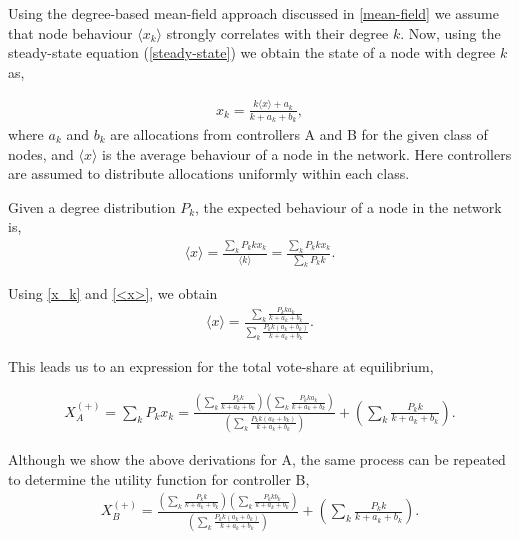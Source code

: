 Using the degree-based mean-field approach discussed in \cref{mean-field} we assume that node behaviour $\langle x_{k} \rangle$ strongly correlates with their degree $k$. Now, using the steady-state equation (\cref{steady-state}) we obtain the state of a node with degree $k$ as,

\begin{align}
    x_{k} = \frac{k\langle x \rangle+a_{k}}{k+a_{k}+b_{k}},
    \label{x_k}
\end{align} 
where $a_{k}$ and $b_{k}$ are allocations from controllers A and B for the given class of nodes, and $\langle x \rangle$ is the average behaviour of a node in the network. Here controllers are assumed to distribute allocations uniformly within each class. 

Given a degree distribution $P_{k}$, the expected behaviour of a node in the network is,
\begin{align}
    \langle x \rangle = \frac{\sum_{k} P_{k} k x_{k}}{\langle k \rangle} = \frac{\sum_{k} P_{k} k x_{k}}{\sum_{k} P_{k} k}.
    \label{<x>}
\end{align}

Using \cref{x_k} and \cref{<x>}, we obtain 
\begin{align}
    \langle x \rangle  = \frac{\sum_{k} \frac{P_{k} k a_{k}}{k+a_{k}+b_{k}}}{\sum_{k} \frac{P_{k} k (a_{k}+b_{k})}{k+a_{k}+b_{k}}}.
\end{align}

This leads us to an expression for the total vote-share at equilibrium,

\begin{align}
    X_{A}^{(+)} = \sum_{k} P_{k}x_{k} = \frac{(\sum_{k} \frac{P_{k} k }{k+a_{k}+b_{k}})(\sum_{k} \frac{P_{k} k a_{k}}{k+a_{k}+b_{k}})}{(\sum_{k} \frac{P_{k} k (a_{k}+b_{k})}{k+a_{k}+b_{k}})}+ (\sum_{k} \frac{P_{k} k}{k+a_{k}+b_{k}}).
    \label{XA-positive}
\end{align}

Although we show the above derivations for A, the same process can be repeated to determine the utility function for controller B,
\begin{align}
    X_{B}^{(+)} = \frac{(\sum_{k} \frac{P_{k} k }{k+a_{k}+b_{k}})(\sum_{k} \frac{P_{k} k b_{k}}{k+a_{k}+b_{k}})}{(\sum_{k} \frac{P_{k} k (a_{k}+b_{k})}{k+a_{k}+b_{k}})}+ (\sum_{k} \frac{P_{k} k}{k+a_{k}+b_{k}}).
    \label{XB-positive}
\end{align}


